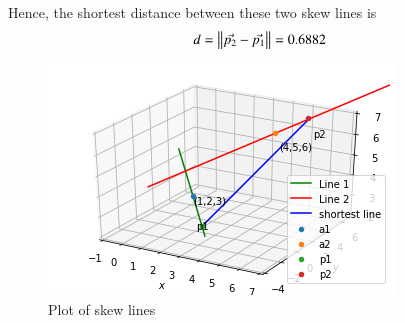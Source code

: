 Hence, the shortest distance between these two skew lines is
\begin{align}
    \label{sep/2/23/eq:18}
   d= \left\lVert\Vec{p_{2}}-\Vec{p_{1}}\right\rVert = 0.6882
\end{align}
\begin{figure}[h]
\centering
\includegraphics[width=\columnwidth]{solutions/sep/2/23/Figures/q4.png}
\caption{Plot of skew lines}
\end{figure}
